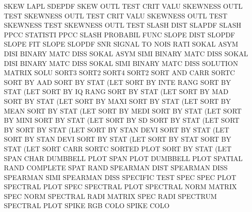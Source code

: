 SKEW     LAPL                           SDEPDF
SKEW     OUTL TEST CRIT VALU            SKEWNESS OUTL TEST
SKEWNESS OUTL TEST CRIT VALU            SKEWNESS OUTL TEST
SKEWNESS TEST                           SKEWNESS OUTL TEST
SLASH    DIST                           SLAPDF
SLASH    PPCC                           STATISTI PPCC
SLASH                                   PROBABIL FUNC
SLOPE    DIST                           SLOPDF
SLOPE                                   FIT
SLOPE                                   SLOPDF
SNR                                     SIGNAL   TO   NOIS RATI
SOKAL    ASYM DISI                      BINARY   MATC DISS
SOKAL    ASYM SIMI                      BINARY   MATC DISS
SOKAL    DISI                           BINARY   MATC DISS
SOKAL    SIMI                           BINARY   MATC DISS
SOLUTION                                MATRIX   SOLU
SORT3                                   SORT2
SORT4                                   SORT2
SORT     AND  CARR                      SORTC
SORT     BY   AAD                       SORT     BY   STAT (LET
SORT     BY   INTE RANG                 SORT     BY   STAT (LET
SORT     BY   IQ   RANG                 SORT     BY   STAT (LET
SORT     BY   MAD                       SORT     BY   STAT (LET
SORT     BY   MAXI                      SORT     BY   STAT (LET
SORT     BY   MEAN                      SORT     BY   STAT (LET
SORT     BY   MEDI                      SORT     BY   STAT (LET
SORT     BY   MINI                      SORT     BY   STAT (LET
SORT     BY   SD                        SORT     BY   STAT (LET
SORT     BY                             SORT     BY   STAT (LET
SORT     BY   STAN DEVI                 SORT     BY   STAT (LET
SORT     BY   STAN DEVI                 SORT     BY   STAT (LET
SORT     BY   STAT                      SORT     BY   STAT (LET
SORT     CARR                           SORTC
SORTED   PLOT                           SORT     BY   STAT (LET
SPAN     CHAR                           DUMBBELL PLOT
SPAN     PLOT                           DUMBBELL PLOT
SPATIAL  RAND                           COMPLETE SPAT RAND
SPEARMAN DIST                           SPEARMAN DISS
SPEARMAN SIMI                           SPEARMAN DISS
SPECIFIC                                TEST     SPEC
SPEC     PLOT                           SPECTRAL PLOT
SPEC                                    SPECTRAL PLOT
SPECTRAL NORM                           MATRIX   SPEC NORM
SPECTRAL RADI                           MATRIX   SPEC RADI
SPECTRUM                                SPECTRAL PLOT
SPIKE    RGB  COLO                      SPIKE    COLO
